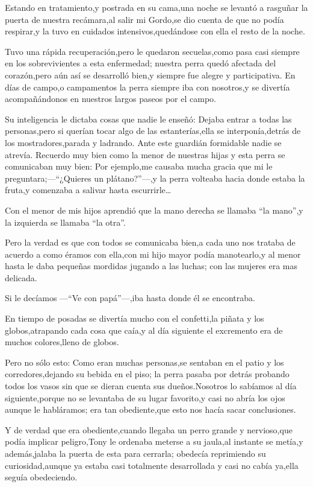 \documentclass[letterpaper,12pt]{book}
\begin{document}
Estando en tratamiento,y postrada en su cama,una noche se levantó a rasguñar la puerta de nuestra recámara,al salir mi Gordo,se dio cuenta de que no podía respirar,y  la tuvo en cuidados intensivos,quedándose con ella el resto de la noche.

Tuvo una rápida recuperación,pero le quedaron secuelas,como pasa casi siempre en los sobrevivientes a esta enfermedad; nuestra perra quedó afectada del corazón,pero aún así se desarrolló bien,y siempre fue alegre y participativa. En días de campo,o campamentos la perra siempre iba con nosotros,y se divertía acompañándonos en nuestros largos paseos por el campo.

Su inteligencia le dictaba cosas que nadie le enseñó: Dejaba entrar a todas las personas,pero si querían tocar algo de las estanterías,ella se interponía,detrás de los mostradores,parada y ladrando. Ante este guardián formidable nadie se atrevía.
Recuerdo muy bien como la menor de nuestras hijas y esta perra se comunicaban muy bien: Por ejemplo,me causaba mucha gracia que mi le preguntara;---``¿Quieres un plátano?''---,y la perra volteaba hacia donde estaba la fruta,y comenzaba a salivar hasta escurrirle\ldots

Con el menor de mis hijos aprendió que la mano derecha se llamaba ``la mano'',y la izquierda se llamaba ``la otra''. 

Pero la verdad es que con todos se comunicaba bien,a cada uno nos trataba de acuerdo a como éramos con ella,con mi hijo mayor podía manotearlo,y al menor hasta le daba pequeñas mordidas jugando a las luchas; con las mujeres era mas delicada.  

Si le decíamos ---``Ve con papá''---,iba hasta donde él se encontraba.

En tiempo de posadas se divertía mucho con el confetti,la piñata y los globos,atrapando cada cosa que caía,y al día siguiente el excremento era de muchos colores,lleno de globos. 

Pero no sólo esto: Como eran muchas personas,se sentaban en el patio y los corredores,dejando su bebida en el piso; la perra pasaba por detrás probando todos los vasos sin que se dieran cuenta sus dueños.Nosotros lo sabíamos al día siguiente,porque no se levantaba de su lugar favorito,y casi no abría los ojos aunque le habláramos; era tan obediente,que esto nos hacía sacar conclusiones.

Y de verdad que era obediente,cuando llegaba un perro grande y nervioso,que podía implicar peligro,Tony le ordenaba meterse a su jaula,al instante se metía,y además,jalaba la puerta de esta para cerrarla; obedecía reprimiendo su curiosidad,aunque ya estaba casi totalmente desarrollada y casi no cabía ya,ella seguía obedeciendo.
\end{document}
